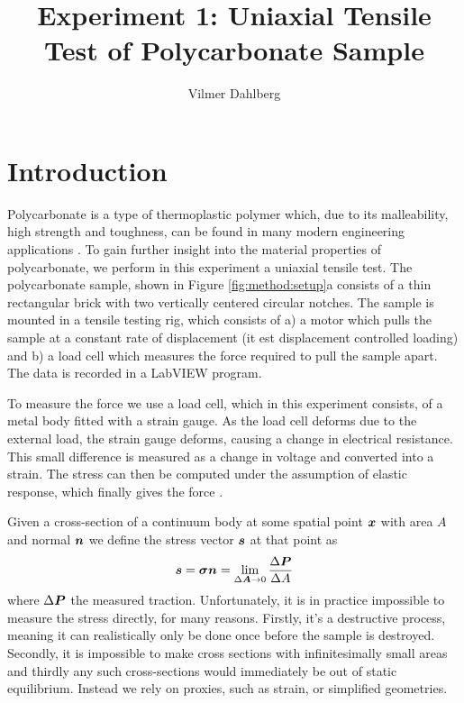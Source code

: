\documentclass[9pt,a4paper,twocolumn,twoside]{rho-class/rho}
\title{Experiment 1: Uniaxial Tensile Test of Polycarbonate Sample}
\author[a,1]{Vilmer Dahlberg}
\affil[a]{Department of Construction Sciences, Lund University}
\newcommand{\bm}[1]{\text{\boldmath{$#1$}}}
\begin{document}
	
	\maketitle
	
	\section{Introduction}
	Polycarbonate is a type of thermoplastic polymer which, due to its malleability, high strength and toughness, can be found in many modern engineering applications \cite{wikipedia_polycarbonate}. To gain further insight into the material properties of polycarbonate, we perform in this experiment a uniaxial tensile test. The polycarbonate sample, shown in Figure \ref{fig:method:setup}a consists of a thin rectangular brick with two vertically centered circular notches. The sample is mounted in a tensile testing rig, which consists of a) a motor which pulls the sample at a constant rate of displacement (it est displacement controlled loading) and b) a load cell which measures the force required to pull the sample apart. The data is recorded in a LabVIEW \cite{national_instruments_labview_2017} program.
	
	To measure the force we use a load cell, which in this experiment consists, of a metal body fitted with a strain gauge. As the load cell deforms due to the external load, the strain gauge deforms, causing a change in electrical resistance. This small difference is measured as a change in voltage and converted into a strain. The stress can then be computed under the assumption of elastic response, which finally gives the force \cite{wikipedia_load_cell}.
	
	Given a cross-section of a continuum body at some spatial point $\bm{x}$ with area $A$ and normal $\bm{n}$ we define the stress vector $\bm{s}$ at that point as
	$$
		\bm{s} = \bm{\sigma}\bm{n} = \lim_{\Delta \bm{A} \rightarrow 0} \frac{\Delta \bm{P}}{\Delta A}
	$$
	where $\Delta \bm{P}$ the measured traction. Unfortunately, it is in practice impossible to measure the stress directly, for many reasons. Firstly, it's a destructive process, meaning it can realistically only be done once before the sample is destroyed. Secondly, it is impossible to make cross sections with infinitesimally small areas and thirdly any such cross-sections would immediately be out of static equilibrium. Instead we rely on proxies, such as strain, or simplified geometries.
\end{document}
